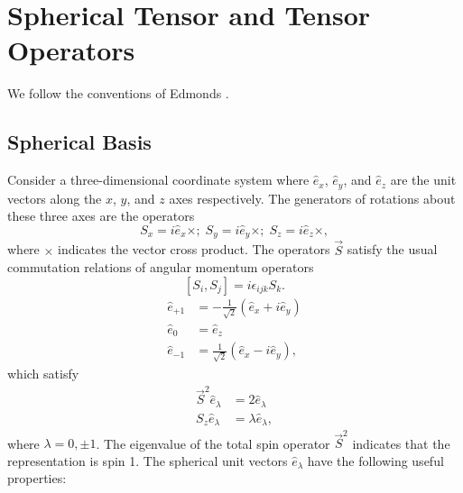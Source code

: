 \documentclass{book}[letterpaper,12pt]
\begin{document}
\chapter{Spherical Tensor and Tensor Operators}
\thispagestyle{headings}
We follow the conventions of Edmonds \cite{edmonds1996angular}. 
\section{Spherical Basis}
Consider a three-dimensional coordinate system where $\hat{e}_x$, $\hat{e}_y$, and $\hat{e}_z$ are the unit vectors along the $x$, $y$, and $z$ axes respectively. The generators of rotations about these three axes are the operators 
\begin{equation}
S_x=i\hat{e}_x\times;\;S_y=i\hat{e}_y\times;\;S_z=i\hat{e}_z\times,
\end{equation}
where $\times$ indicates the vector cross product. The operators $\vec{S}$ satisfy the usual commutation relations of angular momentum operators
\begin{equation}
\left[S_i,S_j\right]=i\epsilon_{ijk}S_k.
\end{equation}
\begin{equation}
\begin{split}
\hat{e}_{+1}&=-\frac{1}{\sqrt{2}}\left(\hat{e}_x+i\hat{e}_y\right)\\
\hat{e}_0&=\hat{e}_z\\
\hat{e}_{-1}&=\frac{1}{\sqrt{2}}\left(\hat{e}_x-i\hat{e}_y\right),
\end{split}
\end{equation}
which satisfy
\begin{equation}
\begin{split}
\vec{S}^2\hat{e}_\lambda&=2\hat{e}_\lambda\\
S_z\hat{e}_\lambda&=\lambda\hat{e}_\lambda,
\end{split}
\end{equation}
where $\lambda=0,\pm 1$. The eigenvalue of the total spin operator $\vec{S}^2$ indicates that the representation is spin 1. The spherical unit vectors $\hat{e}_\lambda$ have the following useful properties:
\end{document}
